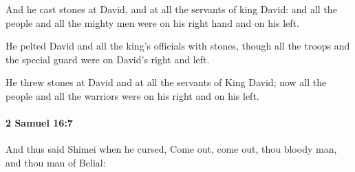 			\begin{versebox}
					\item[BHS] 
					\item[ASV] And he cast stones at David, and at all the servants of king David: and all the people and all the mighty men were on his right hand and on his left.
					\item[NIV] He pelted David and all the king’s officials with stones, though all the troops and the special guard were on David’s right and left.
					\item[NRSV] He threw stones at David and at all the servants of King David; now all the people and all the warriors were on his right and on his left.
			\end{versebox}

		\paragraph{2 Samuel 16:7} %
			\label{2SAMUEL-16-7}

			And thus said Shimei when he cursed, Come out, come out, thou bloody man, and thou man of Belial:

